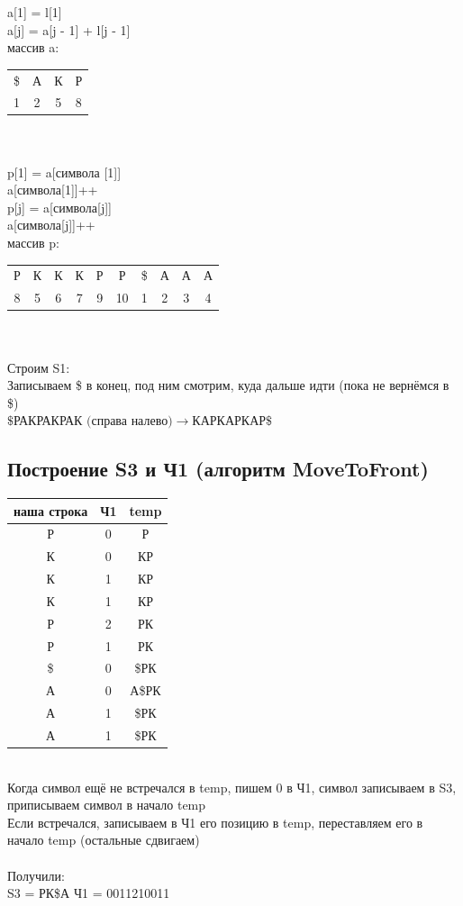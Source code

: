 a[1] = l[1] \\
a[j] = a[j - 1] + l[j - 1] \\
массив a: \\
\begin{tabular}{c c c c}
 \$ & А & К & Р \\
 1 & 2 & 5 & 8
\end{tabular} \\ \ \\

p[1] = a[символа [1]] \\
a[символа[1]]++ \\
p[j] = a[символа[j]] \\
a[символа[j]]++ \\
массив p: \\
\begin{tabular}{c c c c c c c c c c}
 Р & К & К & К & Р & Р & \$ & А & А & А \\
 8 & 5 & 6 & 7 & 9 & 10 & 1 & 2 & 3 & 4
\end{tabular} \\ \ \\

Строим S1: \\
Записываем \$ в конец, под ним смотрим, куда дальше идти (пока не вернёмся в \$) \\
$ \$\text{РАКРАКРАК (справа налево)} \to \text{КАРКАРКАР}\$ $

\subsection{Построение S3 и Ч1 (алгоритм MoveToFront)}

\begin{tabular}{c | c | c}
    наша строка& Ч1 & temp\\
    \hline
    Р & 0 & Р \\
    К & 0 & КР \\
    К & 1 & КР \\
    К & 1 & КР \\
    Р & 2 & РК \\
    Р & 1 & РК \\
    \$ & 0 & \$РК \\
    А & 0 & А\$РК \\
    А & 1 & \$РК \\
    А & 1 & \$РК \\
\end{tabular} \\
Когда символ ещё не встречался в temp, пишем 0 в Ч1, символ записываем в S3, приписываем символ в начало temp \\
Если встречался, записываем в Ч1 его позицию в temp, переставляем его в начало temp (остальные сдвигаем)\\ \ \\
Получили: \\
S3 = РК\$А \quad Ч1 = 0011210011

